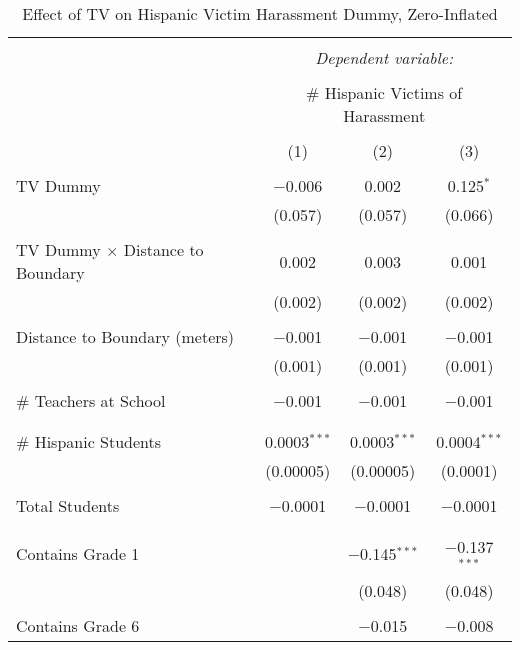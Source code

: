 
\begin{table}[!htbp] \centering 
  \caption{Effect of TV on Hispanic Victim Harassment Dummy, Zero-Inflated} 
  \label{} 
\begin{tabular}{@{\extracolsep{-2pt}}lccc} 
\\[-1.8ex]\hline 
\hline \\[-1.8ex] 
 & \multicolumn{3}{c}{\textit{Dependent variable:}} \\ 
\cline{2-4} 
\\[-1.8ex] & \multicolumn{3}{c}{\# Hispanic Victims of Harassment} \\ 
\\[-1.8ex] & (1) & (2) & (3)\\ 
\hline \\[-1.8ex] 
 TV Dummy & $-$0.006 & 0.002 & 0.125$^{*}$ \\ 
  & (0.057) & (0.057) & (0.066) \\ 
  & & & \\ 
 TV Dummy $\times$ Distance to Boundary & 0.002 & 0.003 & 0.001 \\ 
  & (0.002) & (0.002) & (0.002) \\ 
  & & & \\ 
 Distance to Boundary (meters) & $-$0.001 & $-$0.001 & $-$0.001 \\ 
  & (0.001) & (0.001) & (0.001) \\ 
  & & & \\ 
 \# Teachers at School & $-$0.001 & $-$0.001 & $-$0.001 \\ 
  &  &  &  \\ 
  & & & \\ 
 \# Hispanic Students & 0.0003$^{***}$ & 0.0003$^{***}$ & 0.0004$^{***}$ \\ 
  & (0.00005) & (0.00005) & (0.0001) \\ 
  & & & \\ 
 Total Students & $-$0.0001 & $-$0.0001 & $-$0.0001 \\ 
  &  &  &  \\ 
  & & & \\ 
 Contains Grade 1 &  & $-$0.145$^{***}$ & $-$0.137$^{***}$ \\ 
  &  & (0.048) & (0.048) \\ 
  & & & \\ 
 Contains Grade 6 &  & $-$0.015 & $-$0.008 \\ 

\end{tabular}
\end{table}
